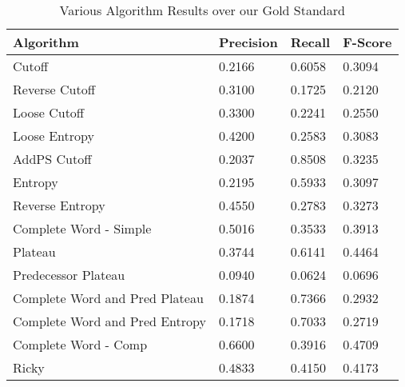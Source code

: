 \documentclass[11pt,letterpaper]{article}
\begin{document}
\begin{table}[b]
\caption{Various Algorithm Results over our Gold Standard}
\begin{tabular}{l|l|l|l}

Algorithm                      & Precision & Recall & F-Score \\
\hline
Cutoff                         &  0.2166   & 0.6058 & 0.3094  \\
Reverse Cutoff                 &  0.3100   & 0.1725 & 0.2120  \\
Loose Cutoff                   & 0.3300    & 0.2241  & 0.2550  \\
Loose Entropy                  &  0.4200   & 0.2583 & 0.3083  \\
AddPS Cutoff                   &  0.2037   & 0.8508 & 0.3235 \\
Entropy                        &  0.2195   & 0.5933 & 0.3097  \\
Reverse Entropy                &   0.4550  & 0.2783 & 0.3273  \\
Complete Word - Simple         &  0.5016   & 0.3533 & 0.3913  \\
Plateau                        &    0.3744 & 0.6141 & 0.4464  \\
Predecessor Plateau            &  0.0940   & 0.0624 & 0.0696  \\
Complete Word and Pred Plateau &  0.1874   & 0.7366 & 0.2932  \\
Complete Word and Pred Entropy &  0.1718   & 0.7033 & 0.2719  \\
Complete Word - Comp           &   0.6600  & 0.3916 & 0.4709  \\
Ricky                          &   0.4833  & 0.4150 & 0.4173  
\end{tabular}
\end{table}
\end{document}
